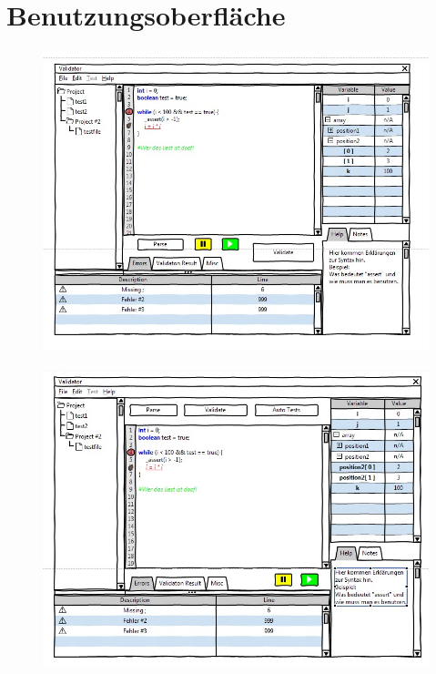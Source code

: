 \documentclass[a4paper,10pt]{article}
\begin{document}
\section{Benutzungsoberfläche}
\begin{figure}
\includegraphics[width=\textwidth]{images/mockup1.jpg}
\end{figure}
\begin{figure}
\includegraphics[width=\textwidth]{images/mockup2.jpg}
\end{figure}
\end{document}
